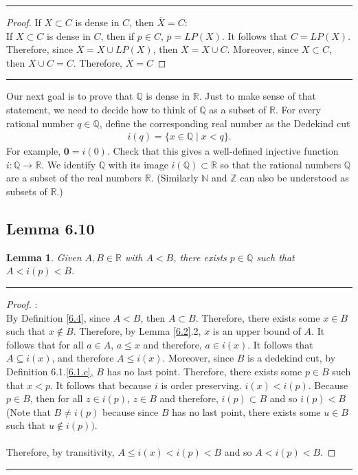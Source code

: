 \documentclass[openany, amssymb, psamsfonts]{amsart}
\newcommand{\bbN}{\mathbb{N}}
\newcommand{\bbQ}{\mathbb{Q}}
\newcommand{\bbR}{\mathbb{R}}
\newcommand{\bbZ}{\mathbb{Z}}
\newcommand{\arr}{\longrightarrow}
\newtheorem{lem}{Lemma}[section]
\theoremstyle{definition}
\numberwithin{equation}{section}
\begin{document}
\vspace{4pt}     \hrule   \vspace{4pt} \begin{proof}  If $X \subset C$ is dense in $C$, then $\overline{X} = C$:\\
If $X \subset C$ is dense in $C$, then if $p\in C$, $p = LP(X)$. It follows that $C = LP(X)$. Therefore, since $\overline{X} = X \cup LP(X)$, then $\overline{X} = X \cup C$. Moreover, since $X\subset C$, then $X\cup C = C$. Therefore, $\overline{X} = C$\newline
\end{proof} \vspace{4pt}     \hrule   \vspace{4pt}
Our next goal is to prove that $\bbQ$ is dense in $\bbR$. Just to make sense of that statement, we need to decide how to think of $\bbQ$ as a subset of $\bbR$.  For every rational number $q\in\bbQ$, define the corresponding real number as the Dedekind cut
\begin{align*}
	i(q) = \{x\in\bbQ\mid x<q\}.
\end{align*}
For example, $\mathbf{0} = i(0)$. Check that this gives a well-defined injective function $i\colon \bbQ \arr \bbR$. We identify $\bbQ$ with its image $i(\bbQ)\subset\bbR$ so that the rational numbers $\bbQ$ are a subset of the real numbers $\bbR$. (Similarly $\bbN $ and $\bbZ$ can also be understood as subsets of $\bbR$.)

\subsection*{Lemma 6.10}
\begin{lem}
\label{6.10}
Given $A, B \in \bbR$ with $A < B$, there exists $p \in \bbQ$ such that $A < i(p) < B$.
\end{lem}
\vspace{4pt}     \hrule   \vspace{4pt} \begin{proof}:\\
By Definition \ref{6.4}, since $A<B$, then $A\subset B$. Therefore, there exists some $x\in B$ such that $x\notin B$. Therefore, by Lemma \ref{6.2}.2, $x$ is an upper bound of $A$. It follows that for all $a\in A$, $a\leq x$ and therefore, $a\in i(x)$. It follows that $A \subseteq i(x)$, and therefore $A \leq i(x)$. Moreover, since $B$ is a dedekind cut, by Definition 6.1.\ref{6.1.c}, $B$ has no last point. Therefore, there exists some $p\in B$ such that $x<p$. It follows that because $i$ is order preserving. $i(x)<i(p)$. Because $p\in B$, then for all $z\in i(p)$, $z\in B$ and therefore, $i(p) \subset B$ and so $i(p)<B$ (Note that $B \neq i(p)$ because since $B$ has no last point, there exists some $u\in B$ such that $u\notin i(p))$.\\\\
Therefore, by transitivity, $A \leq i(x) < i(p) < B$ and so $A<i(p)<B$.
\end{proof}
\vspace{4pt}     \hrule   \vspace{4pt}
\end{document}
